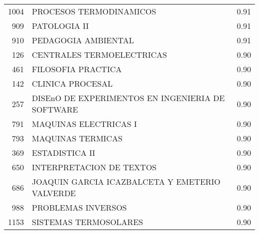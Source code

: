 \begin{table}[ht]
\begin{tabular}{rlr}
  1004 & PROCESOS TERMODINAMICOS & 0.91 \\ 
  909 & PATOLOGIA II & 0.91 \\ 
  910 & PEDAGOGIA AMBIENTAL & 0.91 \\ 
  126 & CENTRALES TERMOELECTRICAS & 0.90 \\ 
  461 & FILOSOFIA PRACTICA & 0.90 \\ 
  142 & CLINICA PROCESAL & 0.90 \\ 
  257 & DISEnO DE EXPERIMENTOS EN INGENIERIA DE SOFTWARE & 0.90 \\ 
  791 & MAQUINAS ELECTRICAS I & 0.90 \\ 
  793 & MAQUINAS TERMICAS & 0.90 \\ 
  369 & ESTADISTICA II & 0.90 \\ 
  650 & INTERPRETACION DE TEXTOS & 0.90 \\ 
  686 & JOAQUIN GARCIA ICAZBALCETA Y EMETERIO VALVERDE & 0.90 \\ 
  988 & PROBLEMAS INVERSOS & 0.90 \\ 
  1153 & SISTEMAS TERMOSOLARES & 0.90 \\ 
   \hline
\end{tabular}
\end{table}
